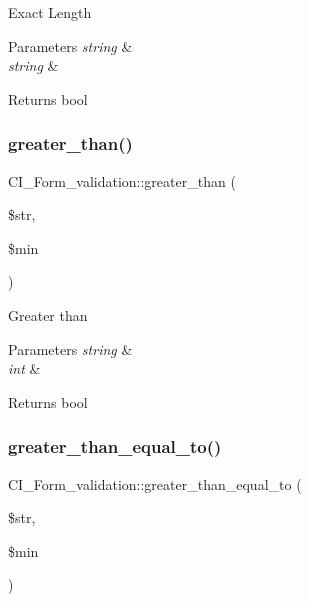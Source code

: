 Exact Length


\begin{DoxyParams}{Parameters}
{\em string} & \\
\hline
{\em string} & \\
\hline
\end{DoxyParams}
\begin{DoxyReturn}{Returns}
bool 
\end{DoxyReturn}
\mbox{\label{class_c_i___form__validation_abb2356d0a98eed32c043709f444f651f}} 
\subsubsection{\texorpdfstring{greater\+\_\+than()}{greater\_than()}}
{\footnotesize\ttfamily C\+I\+\_\+\+Form\+\_\+validation\+::greater\+\_\+than (\begin{DoxyParamCaption}\item[{}]{\$str,  }\item[{}]{\$min }\end{DoxyParamCaption})}

Greater than


\begin{DoxyParams}{Parameters}
{\em string} & \\
\hline
{\em int} & \\
\hline
\end{DoxyParams}
\begin{DoxyReturn}{Returns}
bool 
\end{DoxyReturn}
\mbox{\label{class_c_i___form__validation_a446649cb6ac9e0ca1f194211e64c5b14}} 
\subsubsection{\texorpdfstring{greater\+\_\+than\+\_\+equal\+\_\+to()}{greater\_than\_equal\_to()}}
{\footnotesize\ttfamily C\+I\+\_\+\+Form\+\_\+validation\+::greater\+\_\+than\+\_\+equal\+\_\+to (\begin{DoxyParamCaption}\item[{}]{\$str,  }\item[{}]{\$min }\end{DoxyParamCaption})}

